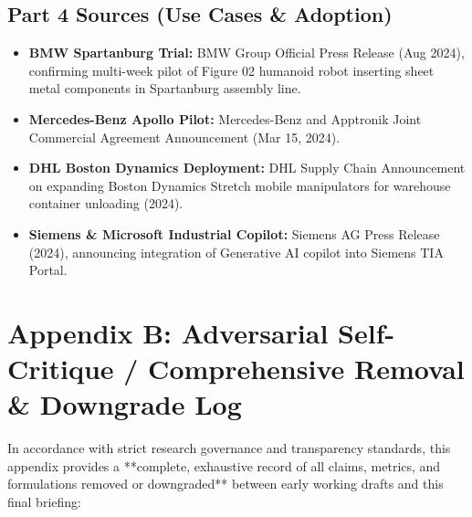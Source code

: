 \documentclass[11pt,a4paper]{article}
\begin{document}
\subsection*{Part 4 Sources (Use Cases \& Adoption)}
\begin{itemize}
    \item \textbf{BMW Spartanburg Trial:} BMW Group Official Press Release (Aug 2024), confirming multi-week pilot of Figure 02 humanoid robot inserting sheet metal components in Spartanburg assembly line.
    \item \textbf{Mercedes-Benz Apollo Pilot:} Mercedes-Benz and Apptronik Joint Commercial Agreement Announcement (Mar 15, 2024).
    \item \textbf{DHL Boston Dynamics Deployment:} DHL Supply Chain Announcement on expanding Boston Dynamics Stretch mobile manipulators for warehouse container unloading (2024).
    \item \textbf{Siemens \& Microsoft Industrial Copilot:} Siemens AG Press Release (2024), announcing integration of Generative AI copilot into Siemens TIA Portal.
\end{itemize}

\newpage
\section{Appendix B: Adversarial Self-Critique / Comprehensive Removal \& Downgrade Log}

In accordance with strict research governance and transparency standards, this appendix provides a **complete, exhaustive record of all claims, metrics, and formulations removed or downgraded** between early working drafts and this final briefing:
\end{document}
